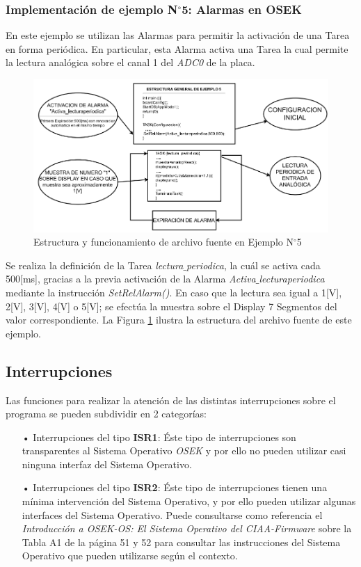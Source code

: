 \documentclass[12pt,letterpaper]{article}
\begin{document}
\subsubsection{Implementación de ejemplo N$^{\circ}$5: Alarmas en OSEK}
En este ejemplo se utilizan las Alarmas para permitir la activación de una Tarea en forma periódica. En particular, esta Alarma activa una Tarea la cual permite la lectura analógica sobre el canal 1 del \textit{ADC0} de la placa.
\begin{center}
\begin{figure}[!h]
\centering
\includegraphics[width=15 cm]{figuras/f36.png}
\caption{Estructura y funcionamiento de archivo fuente en Ejemplo N$^{\circ}$5}
\label{estructuraej5}
\end{figure}
\end{center}
Se realiza la definición de la Tarea \textit{lectura$\_$periodica}, la cuál se activa cada 500[ms], gracias a la previa activación de la Alarma \textit{Activa$\_$lecturaperiodica} mediante la instrucción \textit{SetRelAlarm()}. En caso que la lectura sea igual a 1[V], 2[V], 3[V], 4[V] o 5[V]; se efectúa la muestra sobre el Display 7 Segmentos del valor correspondiente. La Figura \ref{estructuraej5} ilustra la estructura del archivo fuente de este ejemplo.

\subsection{Interrupciones}
Las funciones para realizar la atención de las distintas interrupciones sobre el programa se pueden subdividir en 2 categorías\cite{libroosekcerdeiro}:
\begin{enumerate}
\item[•]Interrupciones del tipo \textbf{ISR1}: Éste tipo de interrupciones son transparentes al Sistema Operativo \textit{OSEK} y por ello no pueden utilizar casi ninguna interfaz del Sistema Operativo.
\item[•]Interrupciones del tipo \textbf{ISR2}: Éste tipo de interrupciones tienen una mínima intervención del Sistema Operativo, y por ello pueden utilizar algunas interfaces del Sistema Operativo. Puede consultarse como referencia el \textit{Introducción a OSEK-OS: El Sistema Operativo del CIAA-Firmware} sobre la Tabla A1 de la página 51 y 52 para consultar las instrucciones del Sistema Operativo que pueden utilizarse según el contexto.
\end{enumerate}
\end{document}
